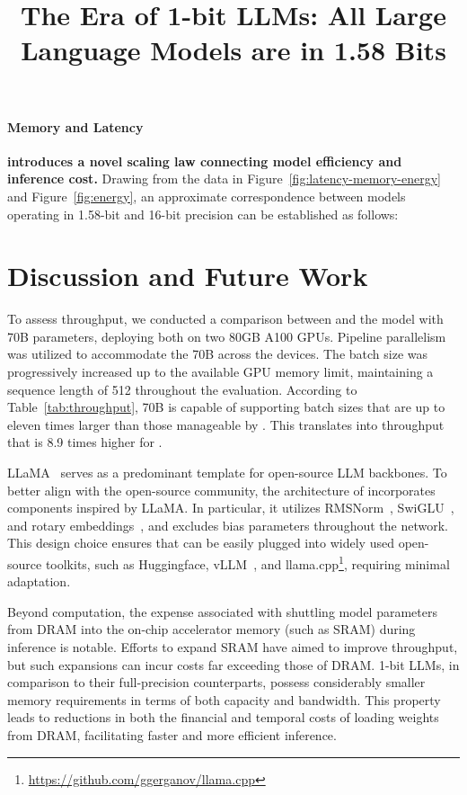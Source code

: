 \title{The Era of 1-bit LLMs: All Large Language Models are in 1.58 Bits}
\paragraph{Memory and Latency}

\textbf{ introduces a novel scaling law connecting model efficiency and inference cost.} Drawing from the data in Figure~\ref{fig:latency-memory-energy} and Figure~\ref{fig:energy}, an approximate correspondence between models operating in 1.58-bit and 16-bit precision can be established as follows:

\section{Discussion and Future Work}

To assess throughput, we conducted a comparison between  and the  model with 70B parameters, deploying both on two 80GB A100 GPUs. Pipeline parallelism~\cite{gpipe} was utilized to accommodate the 70B  across the devices. The batch size was progressively increased up to the available GPU memory limit, maintaining a sequence length of 512 throughout the evaluation. According to Table~\ref{tab:throughput},  70B is capable of supporting batch sizes that are up to eleven times larger than those manageable by . This translates into throughput that is 8.9 times higher for .

LLaMA~\cite{llama, llama2} serves as a predominant template for open-source LLM backbones. To better align with the open-source community, the architecture of  incorporates components inspired by LLaMA. In particular, it utilizes RMSNorm~\cite{rmsnorm}, SwiGLU~\cite{swiglu}, and rotary embeddings~\cite{rope}, and excludes bias parameters throughout the network. This design choice ensures that  can be easily plugged into widely used open-source toolkits, such as Huggingface, vLLM~\cite{vllm}, and llama.cpp\footnote{\url{https://github.com/ggerganov/llama.cpp}}, requiring minimal adaptation.

Beyond computation, the expense associated with shuttling model parameters from DRAM into the on-chip accelerator memory (such as SRAM) during inference is notable. Efforts to expand SRAM have aimed to improve throughput, but such expansions can incur costs far exceeding those of DRAM. 1-bit LLMs, in comparison to their full-precision counterparts, possess considerably smaller memory requirements in terms of both capacity and bandwidth. This property leads to reductions in both the financial and temporal costs of loading weights from DRAM, facilitating faster and more efficient inference.

